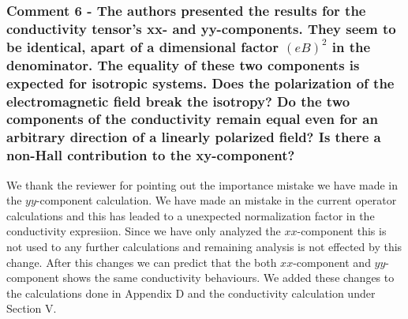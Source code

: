 \documentclass{article}
\begin{document}
\subsubsection*{Comment 6 -
\color{RoyalBlue} The authors presented the results for the conductivity tensor's xx- and yy-components. They seem to be identical, apart of a dimensional factor $(eB)^2$ in the denominator. The equality of these two components is expected for isotropic systems. Does the polarization of the electromagnetic field break the isotropy? Do the two components of the conductivity remain equal even for an arbitrary direction of a linearly polarized field? Is there a non-Hall contribution to the xy-component?
}

We thank the reviewer for pointing out the importance mistake we have made in the $yy$-component calculation. We have made an mistake in the current operator calculations and this has leaded to a unexpected normalization factor in the conductivity expresiion. Since we have only analyzed the $xx$-component this is not used to any further calculations and remaining analysis is not effected by this change. After this changes we can predict that the both $xx$-component and $yy$-component shows the same conductivity behaviours. We added these changes to the calculations done in Appendix D and the conductivity calculation under Section V.
\end{document}
